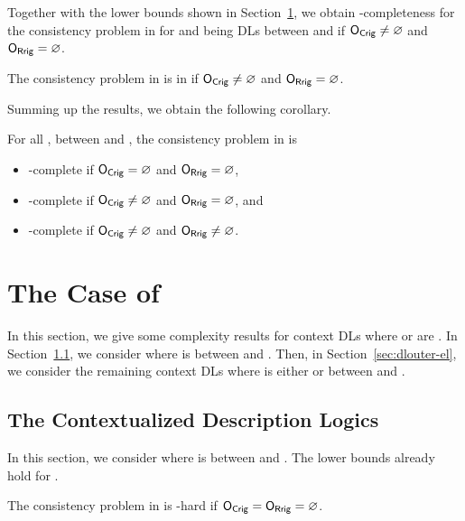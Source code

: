 Together with the lower bounds shown in Section~\ref{sec:case-el}, we obtain \NExpTime-completeness
for the consistency problem in \LMLO for \LM and \LO being DLs between \ALC and \SHOQ if
$\mathsf{O_{Crig}} \neq \varnothing$ and $\mathsf{O_{Rrig}} = \varnothing$.

\begin{theorem}\label{thm:shoiqshoiq-with-rigid-concepts-nexptime}
  The consistency problem in \SHOIQSHOIQ is in \NExpTime if $\mathsf{O_{Crig}} \neq \varnothing$ and $\mathsf{O_{Rrig}}=\varnothing$.
\end{theorem}

\missingproof


Summing up the results, we obtain the following corollary.

\begin{corollary}
  For all \LM, \LO between \ALC and \SHOQ, the consistency problem in \LMLO is
  \begin{itemize}
  \item \ExpTime-complete if $\mathsf{O_{Crig}}=\varnothing$ and $\mathsf{O_{Rrig}}=\varnothing$,
  \item \NExpTime-complete if $\mathsf{O_{Crig}}\ne\varnothing$ and $\mathsf{O_{Rrig}}=\varnothing$, and
  \item \TwoExpTime-complete if $\mathsf{O_{Crig}}\ne\varnothing$ and $\mathsf{O_{Rrig}}\ne\varnothing$.
  \end{itemize}
\end{corollary}

\section{The Case of \texorpdfstring{\EL}{EL}}
\label{sec:case-el} 

In this section, we give some complexity results for context DLs
\LMLO where \LM or \LO are \EL.
%
In Section~\ref{sec:dlinner-el}, we consider \LMEL where \LM
is between \ALC and \SHOQ.  Then, in Section~\ref{sec:dlouter-el}, we consider
the remaining context DLs \ELLO where \LO is either \EL {}or
between \ALC and \SHOQ.

\subsection{The Contextualized Description Logics \texorpdfstring{\LMEL}{LM[EL]}}
\label{sec:dlinner-el}

In this section, we consider \LMEL where \LM is between \ALC
and \SHOQ.
%
The lower bounds already hold for \ALCEL.

\begin{theorem}\label{thm:alcel-lower-no-rigid}
  The consistency problem in \ALCEL is \ExpTime-hard if $\mathsf{O_{Crig}} = \mathsf{O_{Rrig}} = \varnothing$.
\end{theorem}

